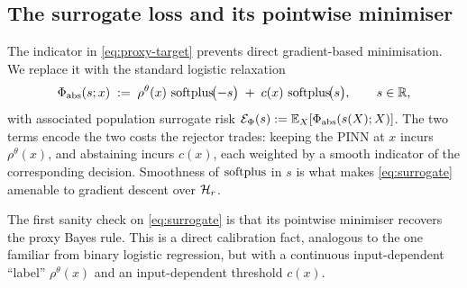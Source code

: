 \subsection{The surrogate loss and its pointwise minimiser}
\label{sec:method-surrogate}

The indicator in \eqref{eq:proxy-target} prevents direct gradient-based
minimisation. We replace it with the standard logistic relaxation
\begin{equation}
  \Phi_{\mathrm{abs}}(s;x)
  \;:=\;
  \rho^\theta(x)\,\operatorname{softplus}\!\bigl(-s\bigr)
  \;+\;c(x)\,\operatorname{softplus}\!\bigl(s\bigr),
  \qquad s\in\mathbb{R},
  \label{eq:surrogate}
\end{equation}
with associated population surrogate risk
$\mathcal{E}_\Phi(s):=\mathbb{E}_X[\Phi_{\mathrm{abs}}(s(X);X)]$. The two terms encode
the two costs the rejector trades: keeping the PINN at $x$ incurs
$\rho^\theta(x)$, and abstaining incurs $c(x)$, each weighted by a smooth
indicator of the corresponding decision. Smoothness of $\operatorname{softplus}$ in
$s$ is what makes \eqref{eq:surrogate} amenable to gradient descent over
$\mathcal{H}_r$.

The first sanity check on \eqref{eq:surrogate} is that its pointwise
minimiser recovers the proxy Bayes rule. This is a direct calibration
fact, analogous to the one familiar from binary logistic regression, but
with a continuous input-dependent ``label'' $\rho^\theta(x)$ and an
input-dependent threshold $c(x)$.

